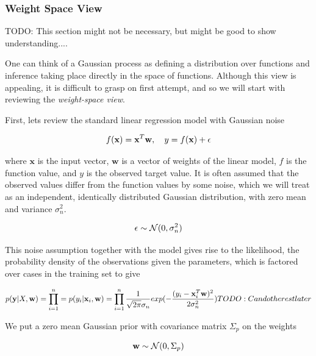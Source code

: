 \documentclass[12pt,a4paper]{report}
\theoremstyle{definition}
\begin{document}
\subsubsection{Weight Space View}

TODO: This section might not be necessary, but might be good to show understanding....

One can think of a Gaussian process as defining a distribution over functions and inference taking place directly in the space of functions. 
Although this view is appealing, it is difficult to grasp on first attempt, and so we will start with reviewing the \emph{weight-space view}.

First, lets review the standard linear regression model with Gaussian noise

\begin{equation}
    \centering
    {f(\textbf{x}) = \textbf{x}^T\textbf{w}, \quad y = f(\textbf{x}) + \epsilon}
\end{equation}

where $\textbf{x}$ is the input vector, $\textbf{w}$ is a vector of weights of the linear model, $f$ is the function value, and $y$ is the observed target value.
It is often assumed that the observed values differ from the function values by some noise, which we will treat as an independent, identically distributed Gaussian distribution, with zero mean and variance $\sigma^2_{n}$.

\begin{equation}
    \centering
    \epsilon \sim \mathcal{N}(0, \sigma^2_{n})
\end{equation}

This noise assumption together with the model gives rise to the likelihood, the probability density of the observations given the parameters, which is factored over cases in the training set to give

\begin{equation}
    \centering
    p(\textbf{y} | X, \textbf{w}) = \prod_{i=1}^n = p(y_{i} | \textbf{x}_{i}, \textbf{w}) =  \prod_{i=1}^n \frac{1}{\sqrt{2\pi}\sigma_{n}} exp(-\frac{(y_{i} - \textbf{x}_{i}^T \textbf{w})^2}{2 \sigma_{n}^2})
    TODO: Can do the rest later
\end{equation}

We put a zero mean Gaussian prior with covariance matrix $\Sigma_{p}$ on the weights 

\begin{equation}
    \centering
    \textbf{w} \sim \mathcal{N}(0, \Sigma_{p})
\end{equation}
\end{document}
